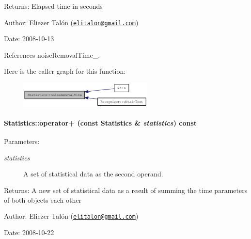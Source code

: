 \begin{Desc}
\item[Returns:]Elapsed time in seconds\end{Desc}
\begin{Desc}
\item[Author:]Eliezer Talón (\href{mailto:elitalon@gmail.com}{\tt elitalon@gmail.com}) \end{Desc}
\begin{Desc}
\item[Date:]2008-10-13 \end{Desc}


References noiseRemovalTime\_\-.

Here is the caller graph for this function:\nopagebreak
\begin{figure}[H]
\begin{center}
\leavevmode
\includegraphics[width=192pt]{class_statistics_2851ad08e1bd9604fe76c78cccc50e84_icgraph}
\end{center}
\end{figure}
\hypertarget{class_statistics_cb07c98a63e07fdb1476ffb282b84676}{
\paragraph[{operator+}]{ Statistics::operator+ (const {\bf Statistics} \& {\em statistics}) const}\hfill}
\label{class_statistics_cb07c98a63e07fdb1476ffb282b84676}


\begin{Desc}
\item[Parameters:]
\begin{description}
\item[{\em statistics}]A set of statistical data as the second operand.\end{description}
\end{Desc}
\begin{Desc}
\item[Returns:]A new set of statistical data as a result of summing the time parameters of both objects each other\end{Desc}
\begin{Desc}
\item[Author:]Eliezer Talón (\href{mailto:elitalon@gmail.com}{\tt elitalon@gmail.com}) \end{Desc}
\begin{Desc}
\item[Date:]2008-10-22 \end{Desc}


